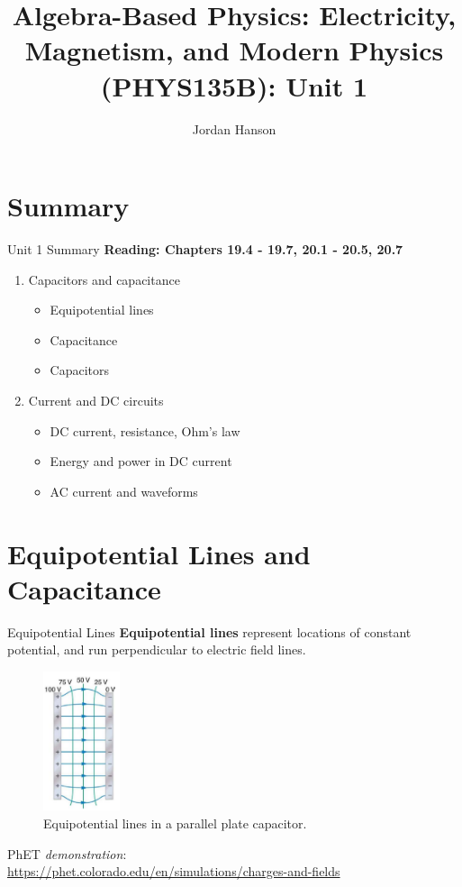 \documentclass{beamer}
\title{Algebra-Based Physics: Electricity, Magnetism, and Modern Physics (PHYS135B): Unit 1}
\author{Jordan Hanson}
\institute{Whittier College Department of Physics and Astronomy}
\begin{document}
\maketitle

\section{Summary}

\begin{frame}{Unit 1 Summary}
\textbf{Reading: Chapters 19.4 - 19.7, 20.1 - 20.5, 20.7}
\begin{enumerate}
\item Capacitors and capacitance
\begin{itemize}
\item Equipotential lines
\item Capacitance
\item Capacitors
\end{itemize}
\item Current and DC circuits
\begin{itemize}
\item DC current, resistance, Ohm's law
\item Energy and power in DC current
\item AC current and waveforms
\end{itemize}
\end{enumerate}
\end{frame}

\section{Equipotential Lines and Capacitance}

\begin{frame}{Equipotential Lines}
\small
\textbf{\alert{Equipotential lines}} represent locations of constant potential, and run perpendicular to electric field lines.
\begin{figure}
\centering
\includegraphics[width=0.2\textwidth]{figures/plates.png}
\caption{\label{fig:plates} Equipotential lines in a parallel plate capacitor.}
\end{figure}
PhET \textit{demonstration}: \\ \url{https://phet.colorado.edu/en/simulations/charges-and-fields}
\end{frame}
\end{document}
